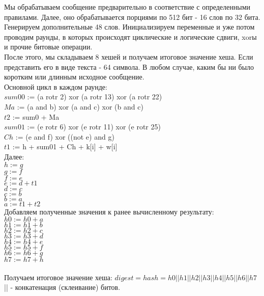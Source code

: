 \documentclass[12pt]{article}
\begin{document}
Мы обрабатываем сообщение предварительно в соответствие с определенными правилами. Далее, оно обрабатывается порциями по 512 бит - 16 слов по 32 бита. Генерируем дополнительные 48 слов. Инициализируем переменные и уже потом проводим раунды, в которых происходят циклические и логические сдвиги, xorы и прочие битовые операции. \\
\newline
После этого, мы складываем 8 хешей и получаем итоговое значение хеша. Если представить его в виде текста - 64 символа. В любом случае, каким бы ни было коротким или длинным исходное сообщение.\\
\newline
Основной цикл в каждом раунде:\\
$sum00$ := (a rotr 2) xor (a rotr 13) xor (a rotr 22) \\
$Ma$ := (a and b) xor (a and c) xor (b and c) \\
$t2$ := sum0 + Ma \\
$sum01$ := (e rotr 6) xor (e rotr 11) xor (e rotr 25) \\
$Ch$ := (e and f) xor ((not e) and g) \\
$t1$ := h + sum01 + Ch + k[i] + w[i] \\

Далее:\\
$h := g$ \\
$g := f$ \\
$f := e$ \\
$e := d + t1$ \\
$d := c$ \\
$c := b$ \\
$b := a$ \\
$a := t1 + t2$ \\

Добавляем полученные значения к ранее вычисленному результату: \\
$h0 := h0 + a$ \\
$h1 := h1 + b$ \\
$h2 := h2 + c$ \\
$h3 := h3 + d$ \\
$h4 := h4 + e$ \\
$h5 := h5 + f$ \\
$h6 := h6 + g$ \\
$h7 := h7 + h$ \\ \\


Получаем итоговое значение хеша:
$digest = hash = h0 || h1 || h2 || h3 || h4 || h5 || h6 || h7$ \\
|| - конкатенация (склеивание) битов.\\
\end{document}
